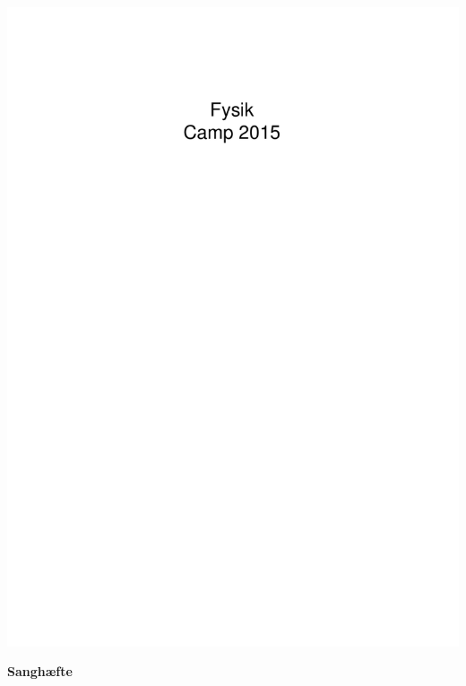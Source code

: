 \vspace{1cm}

\mbox{\includegraphics[clip,trim=7cm 23cm 7cm 4cm,scale=2.3]{MatCamp2014_tekst.pdf}}


\vspace{2.5cm}
{\HUGE\bfseries Sanghæfte}

\newpage
\raggedright


\newpage

\NumberPoemTitle
\renewcommand{\PoemTitlefont}{\normalfont\bfseries\large\centering}
\renewcommand{\PoemTitlenumfont}{\normalfont\bfseries\large\centering}
\renewcommand{\afterPoemTitlenum}{\quad}

